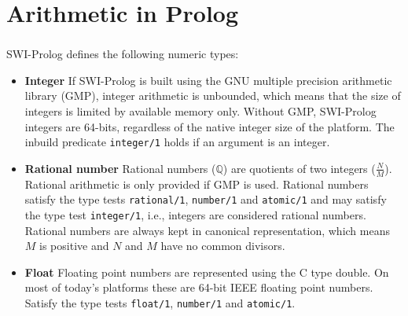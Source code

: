 \section{Arithmetic in Prolog}

\begin{frame}[shrink=3]
	\frametitle{\insertsection}
	
	SWI-Prolog defines the following numeric types:
	
	\begin{itemize}
		\item \textbf{Integer} If SWI-Prolog is built using the GNU multiple precision arithmetic library (GMP), integer arithmetic is unbounded, which means that the size of integers is limited by available memory only. Without GMP, SWI-Prolog integers are 64-bits, regardless of the native integer size of the platform. The inbuild predicate \texttt{integer/1} holds if
		an argument is an integer.
		\item \textbf{Rational number} Rational numbers (\(\mathds{Q} \)) are quotients of two integers (\(\frac{N}{M} \)). Rational arithmetic is only provided if GMP is used. Rational numbers satisfy the type tests \texttt{rational/1}, \texttt{number/1} and \texttt{atomic/1} and may satisfy the type test \texttt{integer/1}, i.e., integers are considered rational numbers. Rational numbers are always kept in canonical representation, which means \(M\) is positive and \(N\) and \(M\) have no common divisors.
		\item \textbf{Float} Floating point numbers are represented using the C type double. On most of today's platforms these are 64-bit IEEE floating point numbers. Satisfy the type tests \texttt{float/1}, \texttt{number/1} and \texttt{atomic/1}.
	\end{itemize}

\end{frame}


